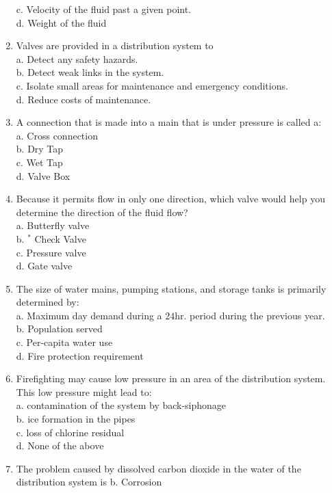 \begin{enumerate}[1.]
c. Velocity of the fluid past a given point.\\
d. Weight of the fluid\\
\item Valves are provided in a distribution system to\\
a. Detect any safety hazards.\\
b. Detect weak links in the system.\\
c. Isolate small areas for maintenance and emergency conditions.\\
d. Reduce costs of maintenance.\\
\item A connection that is made into a main that is under pressure is called a:\\
a. Cross connection\\
b. Dry Tap\\
c. Wet Tap\\
d. Valve Box\\
\item Because it permits flow in only one direction, which valve would help you determine the direction of the fluid flow?\\
a. Butterfly valve\\
b. ${ }^{*}$ Check Valve\\
c. Pressure valve\\
d. Gate valve\\
\item The size of water mains, pumping stations, and storage tanks is primarily determined by:\\
a. Maximum day demand during a $24 \mathrm{hr}$. period during the previous year.\\
b. Population served\\
c. Per-capita water use\\
d. Fire protection requirement\\
\item Firefighting may cause low pressure in an area of the distribution system. This low pressure might lead to:\\
a. contamination of the system by back-siphonage\\
b. ice formation in the pipes\\
c. loss of chlorine residual\\
d. None of the above\\
\item The problem caused by dissolved carbon dioxide in the water of the distribution system is b. Corrosion\\

\end{enumerate}
